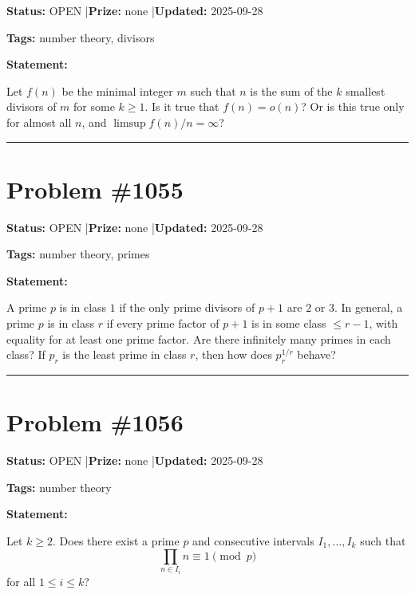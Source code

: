 \documentclass{article}
\begin{document}
\noindent\textbf{Status:} OPEN \quad|\quad \textbf{Prize:} none \quad|\quad \textbf{Updated:} 2025-09-28

\noindent\textbf{Tags:} number theory, divisors

\medskip

\noindent\textbf{Statement:}

Let $f(n)$ be the minimal integer $m$ such that $n$ is the sum of the $k$ smallest divisors of $m$ for some $k\geq 1$. Is it true that $f(n)=o(n)$? Or is this true only for almost all $n$, and $\limsup f(n)/n=\infty$?

\noindent\rule{\linewidth}{0.4pt}


\section{Problem \#1055}
\label{prob:1055}

\noindent\textbf{Status:} OPEN \quad|\quad \textbf{Prize:} none \quad|\quad \textbf{Updated:} 2025-09-28

\noindent\textbf{Tags:} number theory, primes

\medskip

\noindent\textbf{Statement:}

A prime $p$ is in class $1$ if the only prime divisors of $p+1$ are $2$ or $3$. In general, a prime $p$ is in class $r$ if every prime factor of $p+1$ is in some class $\leq r-1$, with equality for at least one prime factor. Are there infinitely many primes in each class? If $p_r$ is the least prime in class $r$, then how does $p_r^{1/r}$ behave?

\noindent\rule{\linewidth}{0.4pt}


\section{Problem \#1056}
\label{prob:1056}

\noindent\textbf{Status:} OPEN \quad|\quad \textbf{Prize:} none \quad|\quad \textbf{Updated:} 2025-09-28

\noindent\textbf{Tags:} number theory

\medskip

\noindent\textbf{Statement:}

Let $k\geq 2$. Does there exist a prime $p$ and consecutive intervals $I_1,\ldots,I_k$ such that\[\prod_{n\in I_i}n \equiv 1\pmod{p}\]for all $1\leq i\leq k$?
\end{document}
